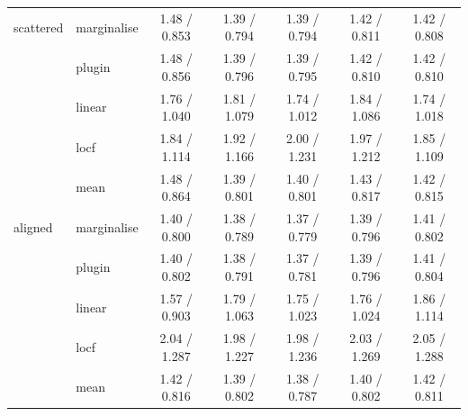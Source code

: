 \begin{table}[htbp]
\begin{tabular}{llccccc}
    \addlinespace
    scattered & marginalise & 1.48 / 0.853 & 1.39 / 0.794 & 1.39 / 0.794 & 1.42 / 0.811 & 1.42 / 0.808 \\
     & plugin & 1.48 / 0.856 & 1.39 / 0.796 & 1.39 / 0.795 & 1.42 / 0.810 & 1.42 / 0.810 \\
     & linear & 1.76 / 1.040 & 1.81 / 1.079 & 1.74 / 1.012 & 1.84 / 1.086 & 1.74 / 1.018 \\
     & locf & 1.84 / 1.114 & 1.92 / 1.166 & 2.00 / 1.231 & 1.97 / 1.212 & 1.85 / 1.109 \\
     & mean & 1.48 / 0.864 & 1.39 / 0.801 & 1.40 / 0.801 & 1.43 / 0.817 & 1.42 / 0.815 \\
    \addlinespace
    aligned & marginalise & 1.40 / 0.800 & 1.38 / 0.789 & 1.37 / 0.779 & 1.39 / 0.796 & 1.41 / 0.802 \\
     & plugin & 1.40 / 0.802 & 1.38 / 0.791 & 1.37 / 0.781 & 1.39 / 0.796 & 1.41 / 0.804 \\
     & linear & 1.57 / 0.903 & 1.79 / 1.063 & 1.75 / 1.023 & 1.76 / 1.024 & 1.86 / 1.114 \\
     & locf & 2.04 / 1.287 & 1.98 / 1.227 & 1.98 / 1.236 & 2.03 / 1.269 & 2.05 / 1.288 \\
     & mean & 1.42 / 0.816 & 1.39 / 0.802 & 1.38 / 0.787 & 1.40 / 0.802 & 1.42 / 0.811 \\
    \bottomrule
  \end{tabular}
\end{table}
